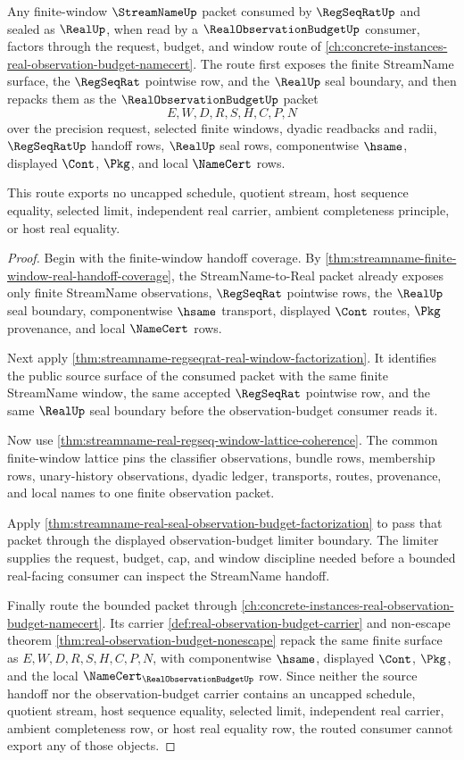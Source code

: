 \begin{theorem}
\label{thm:streamname-real-observation-budget-route}
Any finite-window $\StreamNameUp$ packet consumed by $\RegSeqRatUp$ and sealed as $\RealUp$, when read by a $\RealObservationBudgetUp$ consumer, factors through the request, budget, and window route of \autoref{ch:concrete-instances-real-observation-budget-namecert}. The route first exposes the finite StreamName surface, the $\RegSeqRat$ pointwise row, and the $\RealUp$ seal boundary, and then repacks them as the $\RealObservationBudgetUp$ packet
$$
E,W,D,R,S,H,C,P,N
$$
over the precision request, selected finite windows, dyadic readbacks and radii, $\RegSeqRatUp$ handoff rows, $\RealUp$ seal rows, componentwise $\hsame$, displayed $\Cont$, $\Pkg$, and local $\NameCert$ rows.

This route exports no uncapped schedule, quotient stream, host sequence equality, selected limit, independent real carrier, ambient completeness principle, or host real equality.
\end{theorem}
\begin{proof}
Begin with the finite-window handoff coverage. By \autoref{thm:streamname-finite-window-real-handoff-coverage}, the StreamName-to-Real packet already exposes only finite StreamName observations, $\RegSeqRat$ pointwise rows, the $\RealUp$ seal boundary, componentwise $\hsame$ transport, displayed $\Cont$ routes, $\Pkg$ provenance, and local $\NameCert$ rows.

Next apply \autoref{thm:streamname-regseqrat-real-window-factorization}. It identifies the public source surface of the consumed packet with the same finite StreamName window, the same accepted $\RegSeqRat$ pointwise row, and the same $\RealUp$ seal boundary before the observation-budget consumer reads it.

Now use \autoref{thm:streamname-real-regseq-window-lattice-coherence}. The common finite-window lattice pins the classifier observations, bundle rows, membership rows, unary-history observations, dyadic ledger, transports, routes, provenance, and local names to one finite observation packet.

Apply \autoref{thm:streamname-real-seal-observation-budget-factorization} to pass that packet through the displayed observation-budget limiter boundary. The limiter supplies the request, budget, cap, and window discipline needed before a bounded real-facing consumer can inspect the StreamName handoff.

Finally route the bounded packet through \autoref{ch:concrete-instances-real-observation-budget-namecert}. Its carrier \autoref{def:real-observation-budget-carrier} and non-escape theorem \autoref{thm:real-observation-budget-nonescape} repack the same finite surface as $E,W,D,R,S,H,C,P,N$, with componentwise $\hsame$, displayed $\Cont$, $\Pkg$, and the local $\NameCert_{\RealObservationBudgetUp}$ row. Since neither the source handoff nor the observation-budget carrier contains an uncapped schedule, quotient stream, host sequence equality, selected limit, independent real carrier, ambient completeness row, or host real equality row, the routed consumer cannot export any of those objects.
\end{proof}

